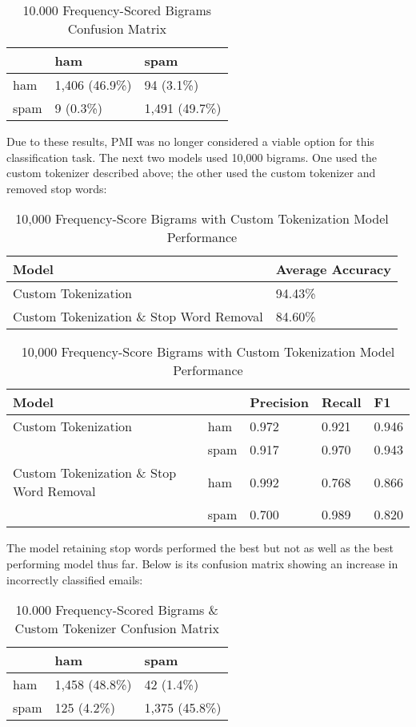 \documentclass[a4paper]{article}
\begin{document}
	\begin{table}[H]
		\centering
		\caption{10.000 Frequency-Scored Bigrams Confusion Matrix}
		\begin{tabular}{l|ll}
			& ham & spam \\
			\hline
			ham & 1,406 (46.9\%) & 94 (3.1\%) \\
			spam & 9 (0.3\%) & 1,491 (49.7\%)
		\end{tabular}
	\end{table}
	
	Due to these results, PMI was no longer considered a viable option for this classification task. The next two models used 10,000 bigrams. One used the custom tokenizer described above; the other used the custom tokenizer and removed stop words:
	
	\begin{table}[H]
		\centering
		\caption{10,000 Frequency-Score Bigrams with Custom Tokenization Model Performance}
		\begin{tabular}{ll}
			Model & Average Accuracy \\
			\hline
			Custom Tokenization & 94.43\% \\
			Custom Tokenization \& Stop Word Removal & 84.60\%
		\end{tabular}
		\begin{tabular}{l|llll}
		\hline
		\hline
			Model & & Precision & Recall & F1 \\
			\hline
			Custom Tokenization & ham  & 0.972 & 0.921 & 0.946 \\
								& spam & 0.917 & 0.970 & 0.943 \\
			\hline
			Custom Tokenization \& Stop Word Removal & ham  & 0.992 & 0.768 & 0.866 \\
											      	 & spam & 0.700 & 0.989 & 0.820
		\end{tabular}
	\end{table}

	The model retaining stop words performed the best but not as well as the best performing model thus far. Below is its confusion matrix showing an increase in incorrectly classified emails:
	
	\begin{table}[H]
		\centering
		\caption{10.000 Frequency-Scored Bigrams \& Custom Tokenizer Confusion Matrix}
		\begin{tabular}{l|ll}
			& ham & spam \\
			\hline
			ham & 1,458 (48.8\%) & 42 (1.4\%) \\
			spam & 125 (4.2\%) & 1,375 (45.8\%)
		\end{tabular}
	\end{table}
\end{document}
